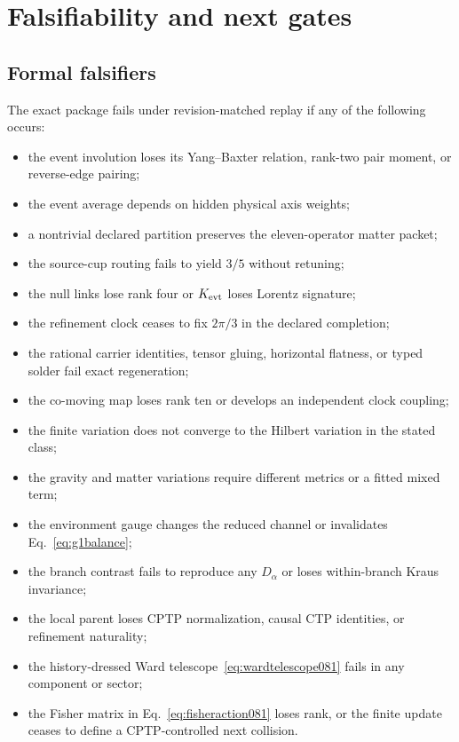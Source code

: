 \documentclass[11pt]{article}
\theoremstyle{definition}
\theoremstyle{remark}
\begin{document}
\section{Falsifiability and next gates}

\subsection{Formal falsifiers}

The exact package fails under revision-matched replay if any of the following occurs:
\begin{itemize}
\item the event involution loses its Yang--Baxter relation, rank-two pair moment, or reverse-edge pairing;
\item the event average depends on hidden physical axis weights;
\item a nontrivial declared partition preserves the eleven-operator matter packet;
\item the source-cup routing fails to yield $3/5$ without retuning;
\item the null links lose rank four or $K_{\rm evt}$ loses Lorentz signature;
\item the refinement clock ceases to fix $2\pi/3$ in the declared completion;
\item the rational carrier identities, tensor gluing, horizontal flatness, or typed solder fail exact regeneration;
\item the co-moving map loses rank ten or develops an independent clock coupling;
\item the finite variation does not converge to the Hilbert variation in the stated class;
\item the gravity and matter variations require different metrics or a fitted mixed term;
\item the environment gauge changes the reduced channel or invalidates Eq.~\eqref{eq:g1balance};
\item the branch contrast fails to reproduce any $D_\alpha$ or loses within-branch Kraus invariance;
\item the local parent loses CPTP normalization, causal CTP identities, or refinement naturality;
\item the history-dressed Ward telescope~\eqref{eq:wardtelescope081} fails in any component or sector;
\item the Fisher matrix in Eq.~\eqref{eq:fisheraction081} loses rank, or the finite update ceases to define a CPTP-controlled next collision.

\end{itemize}
\end{document}
